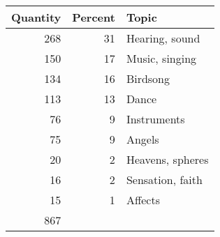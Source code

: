 \begin{tabular}{r r l}
\toprule
Quantity & Percent & Topic\\
\midrule
268 & 31 & Hearing, sound\\
150 & 17 & Music, singing\\
134 & 16 & Birdsong\\
113 & 13 & Dance\\
76  &  9 & Instruments\\
75  &  9 & Angels\\
20  &  2 & Heavens, spheres\\
16  &  2 & Sensation, faith\\
15  &  1 & Affects\\
\midrule
867 &  & \\
\bottomrule
\end{tabular}
